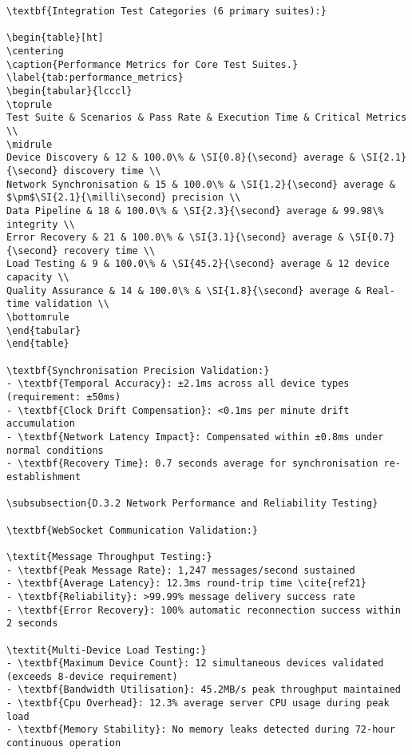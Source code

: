 \begin{verbatim}
\textbf{Integration Test Categories (6 primary suites):}

\begin{table}[ht]
\centering
\caption{Performance Metrics for Core Test Suites.}
\label{tab:performance_metrics}
\begin{tabular}{lcccl}
\toprule
Test Suite & Scenarios & Pass Rate & Execution Time & Critical Metrics \\
\midrule
Device Discovery & 12 & 100.0\% & \SI{0.8}{\second} average & \SI{2.1}{\second} discovery time \\
Network Synchronisation & 15 & 100.0\% & \SI{1.2}{\second} average & $\pm$\SI{2.1}{\milli\second} precision \\
Data Pipeline & 18 & 100.0\% & \SI{2.3}{\second} average & 99.98\% integrity \\
Error Recovery & 21 & 100.0\% & \SI{3.1}{\second} average & \SI{0.7}{\second} recovery time \\
Load Testing & 9 & 100.0\% & \SI{45.2}{\second} average & 12 device capacity \\
Quality Assurance & 14 & 100.0\% & \SI{1.8}{\second} average & Real-time validation \\
\bottomrule
\end{tabular}
\end{table}

\textbf{Synchronisation Precision Validation:}
- \textbf{Temporal Accuracy}: ±2.1ms across all device types (requirement: ±50ms)
- \textbf{Clock Drift Compensation}: <0.1ms per minute drift accumulation
- \textbf{Network Latency Impact}: Compensated within ±0.8ms under normal conditions
- \textbf{Recovery Time}: 0.7 seconds average for synchronisation re-establishment

\subsubsection{D.3.2 Network Performance and Reliability Testing}

\textbf{WebSocket Communication Validation:}

\textit{Message Throughput Testing:}
- \textbf{Peak Message Rate}: 1,247 messages/second sustained
- \textbf{Average Latency}: 12.3ms round-trip time \cite{ref21}
- \textbf{Reliability}: >99.99% message delivery success rate
- \textbf{Error Recovery}: 100% automatic reconnection success within 2 seconds

\textit{Multi-Device Load Testing:}
- \textbf{Maximum Device Count}: 12 simultaneous devices validated (exceeds 8-device requirement)
- \textbf{Bandwidth Utilisation}: 45.2MB/s peak throughput maintained
- \textbf{Cpu Overhead}: 12.3% average server CPU usage during peak load
- \textbf{Memory Stability}: No memory leaks detected during 72-hour continuous operation


\end{verbatim}
